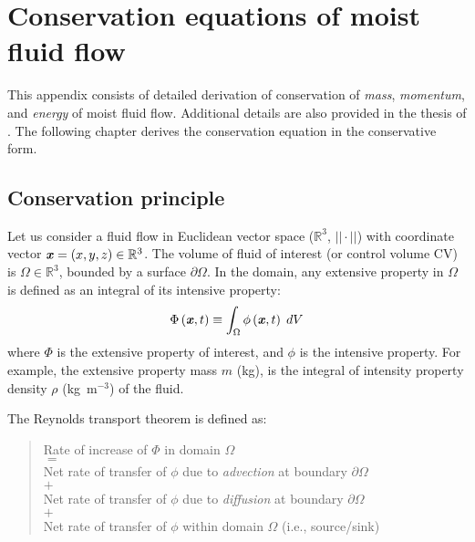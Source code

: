 \chapter{Conservation equations of moist fluid flow}
\label{app:conservation}

This appendix consists of detailed derivation of conservation of \textit{mass}, \textit{momentum}, and \textit{energy} of moist fluid flow. Additional details are also provided in the thesis of \cite{Defraeye2011}. The following chapter derives the conservation equation in the conservative form. 

\section{Conservation principle}
\label{sec:Conservationprinciple}
Let us consider a fluid flow in Euclidean vector space ($\mathbb{R}^3$, $||\cdot||$) with coordinate vector $\textbf{\textit{x}} = (x,y,z) \in \mathbb{R}^3$. The volume of fluid of interest (or control volume CV) is $\Omega \in \mathbb{R}^3$, bounded by a surface $\partial\Omega$. In the domain, any extensive property in $\Omega$ is defined as an integral of its intensive property:
\begin{equation}
\Phi \left( \textbf{\textit{x}},t \right) \equiv \int_\Omega  \phi  \left( \textbf{\textit{x}},t \right)\;dV
\end{equation}
where $\Phi$ is the extensive property of interest, and $\phi$ is the intensive property. For example, the extensive property mass $m$ (kg), is the integral of intensity property density $\rho$ (kg~m$^{-3}$) of the fluid. 

The Reynolds transport theorem is defined as:
\begin{quote}
	\centering
	Rate of increase of $\Phi$ in domain $\Omega$\\
	$=$\\
	Net rate of transfer of $\phi$ due to \textit{advection} at boundary $\partial \Omega$\\
	$+$\\
	Net rate of transfer of $\phi$ due to \textit{diffusion} at boundary $\partial \Omega$\\
$+$\\	
	Net rate of transfer of $\phi$ within domain $\Omega$ (i.e., source/sink)
\end{quote}

